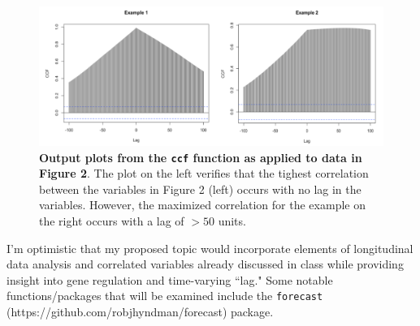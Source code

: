 \documentclass{article}\usepackage[]{graphicx}\usepackage[]{color}
\begin{document}
\begin{figure}[ht]
    \centering
    \includegraphics[width=\textwidth]{two.png}
    \caption{\textbf{Output plots from the \texttt{ccf} function as applied to data in Figure 2}. The plot on the left verifies that the tighest correlation between the variables in Figure 2 (left) occurs with no lag in the variables. However, the maximized correlation for the example on the right occurs with a lag of $> 50$ units.} 
    \label{fig:two}
\end{figure}

\noindent I'm optimistic that my proposed topic would incorporate elements of longitudinal data analysis and correlated variables already discussed in class while providing insight into gene regulation and time-varying ``lag." Some notable functions/packages that will be examined include the \texttt{forecast} (https://github.com/robjhyndman/forecast) package.
\end{document}
